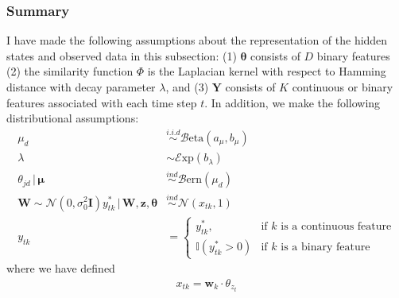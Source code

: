 \documentclass[12pt,letterpaper]{report}
\newcommand{\Norm}[2]{\mathcal{N}(#1,#2)}
\newcommand{\Exp}[1]{\mathcal{E}\mathrm{xp}(#1)}
\newcommand{\Bern}[1]{\mathcal{B}\mathrm{ern}\left(#1\right)}
\newcommand{\Beta}[2]{\mathcal{B}\mathrm{eta}(#1,#2)}
\newcommand{\given}{\, \vert \,}
\newcommand{\bY}{\mathbf{Y}}
\newcommand{\bz}{\mathbf{z}}
\newcommand{\bw}{\mathbf{w}}
\newcommand{\bW}{\mathbf{W}}
\newcommand{\btheta}{\boldsymbol{\theta}}
\newcommand{\bmu}{\boldsymbol{\mu}}
\begin{document}
\subsubsection{Summary}
\label{sec:summary}

I have made the following assumptions about the representation of the
hidden states and observed data in this subsection:
(1) $\btheta$ consists of $D$ binary features (2) the similarity function $\Phi$
is the Laplacian kernel with respect to Hamming distance with
decay parameter $\lambda$, and (3) $\bY$ consists of $K$ continuous or 
binary features associated with each time step $t$.  In addition, we
make the following distributional assumptions:
\begin{align}
\mu_d &\stackrel{i.i.d}{\sim} \Beta{a_{\mu}}{b_{\mu}} \\
\lambda &\sim \Exp{b_{\lambda}} \\
\theta_{jd} \given \bmu &\stackrel{ind}{\sim} \Bern{\mu_d} \\
\bW \sim \Norm{0}{\sigma^2_0 \mathbf{I}}
y^*_{tk} \given \bW, \bz, \btheta &\stackrel{ind}{\sim} \Norm{x_{tk}}{1} \\
y_{tk} &= \begin{cases}
  y^*_{tk}, & \text{if $k$ is a continuous feature} \\
  \mathbb{I}(y^*_{tk} > 0) & \text{if $k$ is a binary feature}
\end{cases}
\end{align}
where we have defined
\begin{align}
  \label{eq:102}
  x_{tk} = \bw_k \cdot \theta_{z_t}
\end{align}
\end{document}

